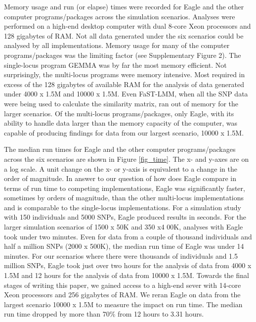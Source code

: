 \documentclass{bioinfo}
\begin{document}
Memory usage and run (or elapse) times were recorded for Eagle and the other computer programs/packages across the simulation scenarios. 
Analyses were performed on a high-end desktop computer with dual 8-core Xeon processors and 128 gigabytes of RAM. Not all data generated under the six scenarios could be analysed by all implementations. Memory usage 
for many of the computer programs/packages was the limiting factor (see Supplementary Figure 2).  The single-locus program GEMMA was by 
far the most memory efficient. Not surprisingly, the multi-locus programs were memory intensive. Most required in 
excess of the 128 gigabytes of available RAM for the analysis of data generated under 4000 x 1.5M and 10000 x 1.5M.  
Even FaST-LMM, when all the SNP data were being used to calculate the similarity matrix, ran out of memory for the larger scenarios.
Of the multi-locus programs/packages, only Eagle,  
with its ability to handle data larger than the memory capacity of the computer, was capable of producing findings 
for data from our largest scenario, 10000 x 1.5M. 



The median run times for Eagle and the other computer programs/packages across the six scenarios are shown in Figure \ref{fig_time}. 
The x- and y-axes are on a log scale.  A unit change on the x- or y-axis is equivalent to a change in the order of magnitude.  
In answer to our question of how does Eagle compare in terms of run time to competing implementations, 
Eagle was significantly faster, sometimes by orders of magnitude,  than the other multi-locus
 implementations and is comparable to the single-locus implementations. For a simulation study with 150 individuals and 
 5000 SNPs, Eagle produced results in seconds.  For the larger simulation scenarios of 1500 x  50K and 350 x4 00K, 
 analyses with Eagle took under two minutes. Even for data from a couple of thousand individuals and half a million 
 SNPs (2000 x 500K), the median run time of Eagle was under 14 minutes. For our scenarios where there 
 were thousands of individuals and 1.5 million SNPs, Eagle took just over two hours for the analysis of data from 
 4000 x 1.5M and  12 hours for the analysis of data from 10000 x 1.5M. 
 Towards the final stages of writing this paper, 
 we gained access to a high-end sever with 14-core Xeon processors and 256 gigabytes of RAM. We reran Eagle on data from the largest
  scenario 10000 x 1.5M to measure the impact on run time. The median run time dropped by more than 70\% 
  from 12 hours to 3.31 hours. 
 
\end{document}
